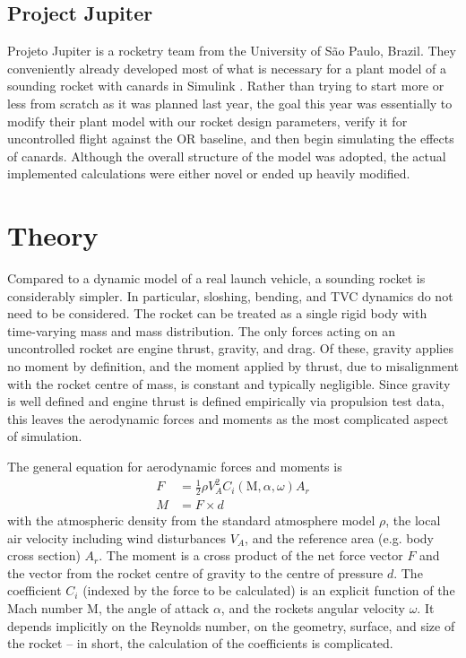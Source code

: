 \subsection{Project Jupiter}
Projeto Jupiter is a rocketry team from the University of São Paulo, Brazil. They conveniently already developed most of what is necessary for a plant model of a sounding rocket with canards in Simulink \cite{jupiter-canards}. Rather than trying to start more or less from scratch as it was planned last year, the goal this year was essentially to modify their plant model with our rocket design parameters, verify it for uncontrolled flight against the OR baseline, and then begin simulating the effects of canards.
Although the overall structure of the model was adopted, the actual implemented calculations were either novel or ended up heavily modified. 

\section{Theory}
Compared to a dynamic model of a real launch vehicle, a sounding rocket is considerably simpler. In particular, sloshing, bending, and TVC dynamics do not need to be considered. The rocket can be treated as a single rigid body with time-varying mass and mass distribution. The only forces acting on an uncontrolled rocket are engine thrust, gravity, and drag. Of these, gravity applies no moment by definition, and the moment applied by thrust, due to misalignment with the rocket centre of mass, is constant and typically negligible. Since gravity is well defined and engine thrust is defined empirically via propulsion test data, this leaves the aerodynamic forces and moments as the most complicated aspect of simulation.

The general equation for aerodynamic forces and moments is 
\begin{align}
    F &= \frac{1}{2} \rho V_A^2 C_i(\mathrm{M}, \alpha, \omega) A_r \label{eq:plant-theory-force}
    \\
    M &= F \times d \label{eq:plant-theory-moment}
\end{align}
with the atmospheric density from the standard atmosphere model $\rho$, the local air velocity including wind disturbances $V_A$, and the reference area (e.g. body cross section) $A_r$.
The moment is a cross product of the net force vector $F$ and the vector from the rocket centre of gravity to the centre of pressure $d$.
The coefficient $C_i$ (indexed by the force to be calculated) is an explicit function of the Mach number $\mathrm{M}$, the angle of attack $\alpha$, and the rockets angular velocity $\omega$. 
It depends implicitly on the Reynolds number, on the geometry, surface, and size of the rocket -- in short, the calculation of the coefficients is complicated.

